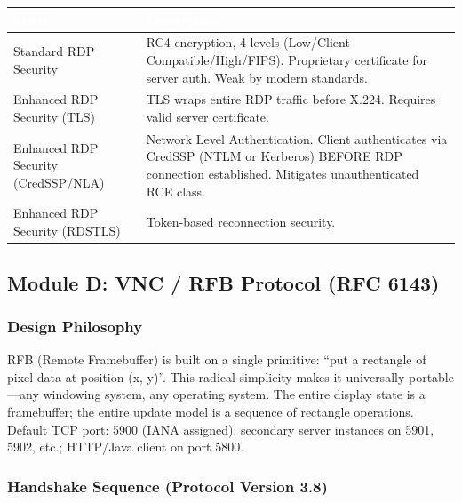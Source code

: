 \documentclass[11pt,letterpaper]{article}
\newcommand{\tableheader}[1]{\textbf{\sffamily\textcolor{white}{#1}}}
\begin{document}
\begin{center}
\begin{tabularx}{\textwidth}{L{3.5cm}X}
\toprule
{}
\tableheader{Mode} & \tableheader{Description} \\
\midrule
Standard RDP Security & RC4 encryption, 4 levels (Low/Client Compatible/High/FIPS). Proprietary certificate for server auth. Weak by modern standards. \\
Enhanced RDP Security (TLS) & TLS wraps entire RDP traffic before X.224. Requires valid server certificate. \\
Enhanced RDP Security (CredSSP/NLA) & Network Level Authentication. Client authenticates via CredSSP (NTLM or Kerberos) BEFORE RDP connection established. Mitigates unauthenticated RCE class. \\
Enhanced RDP Security (RDSTLS) & Token-based reconnection security. \\
\bottomrule
\end{tabularx}
\end{center}

\subsection{Module D: VNC / RFB Protocol (RFC 6143)}

\subsubsection{Design Philosophy}

RFB (Remote Framebuffer) is built on a single primitive: ``put a rectangle of pixel data at position (x, y)''. This radical simplicity makes it universally portable---any windowing system, any operating system. The entire display state is a framebuffer; the entire update model is a sequence of rectangle operations. Default TCP port: 5900 (IANA assigned); secondary server instances on 5901, 5902, etc.; HTTP/Java client on port 5800.

\subsubsection{Handshake Sequence (Protocol Version 3.8)}
\end{document}

